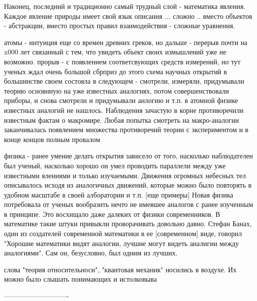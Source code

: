 Наконец, последний и традиционно самый трудный слой - математика явления.
Каждое явление природы имеет свой язык описания  ...  сложно .. вместо объектов - абстракции, вместо простых правил взаимодействия - сложные уравнения.



атомы - интуиция еще со времен древних греков, но дальше - перерыв почти на x000 лет связанный с тем, что увидеть объект своих измышлений уже не возможно.
прорыв - с появлением соответсвующих средств измерений, но тут ученых ждал очень большой сбрприз
до этого схема научных открытий в большинстве своем состояла в следующем - смотрели, измеряли, придумывали теорию основнную на уже известных аналогиях, потом совершенствовали приборы, и снова смотрели и придумывали анлогию и т.п.
в атомной физике известных аналогий не нашлось. Наблюдения зачастую в корне противоречили известным фактам о макромире. Любая попытка смотреть на макро-аналогии заканчивалась появлением множества противоречий теории с экспериментом и в конце концов полным провалом 


физика - ранее умение делать открытия зависело от того, насколько наблюдателен был ученый, насколько хорошо он умел проводить параллели между уже известными ялениями и только изучаемыми.
Движения огромных небесных тел описывалось исходя из аналогичных движений, которые можно было повторять в удобном масштабе в своей алборатории и т.п. [еще примеры]
Новая физика потребовала от ученых вообразить нечто не имевшее аналогов с ранее изученным в принципе. 
Это восхищало даже далеких от физики современников.
В математике такие штуки привыкли проворачивать довольно давно. 
Стефан Банах, один из создателей современной математики в ее [современном] виде, говорил "Хорошие математики видят аналогии, лучшие могут видеть аналигии между аналогиями". Сам он, безусловно, был одним из лучших.

 
слова "теория относительноси", "квантовая механик" носились в воздухе. Их можно было слышать  понимающих и истолковыва

----------------------------



